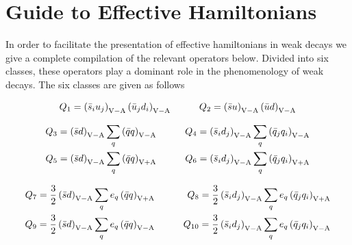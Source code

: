 \section{Guide to Effective Hamiltonians}
         \label{sec:Heffguide}
In order to facilitate the presentation of effective
hamiltonians in weak decays we give a complete compilation of the
relevant operators below. Divided into six classes, these 
operators play a dominant role in the phenomenology of weak decays.
The six classes are given as follows

\medskip


\begin{eqnarray}
Q_{1} = \left( \bar s_{i} u_{j}  \right)_{\rm V-A}
            \left( \bar u_{j}  d_{i} \right)_{\rm V-A}
&\qquad&
Q_{2} = \left( \bar s u \right)_{\rm V-A}
            \left( \bar u d \right)_{\rm V-A}
\label{eq:Q12}
\end{eqnarray}


\begin{eqnarray}
Q_{3} = \left( \bar s d \right)_{\rm V-A}
   \sum_{q} \left( \bar q q \right)_{\rm V-A}
&\qquad&
Q_{4} = \left( \bar s_{i} d_{j}  \right)_{\rm V-A}
   \sum_{q} \left( \bar q_{j}  q_{i} \right)_{\rm V-A}
\label{eq:Q34} \\
Q_{5} = \left( \bar s d \right)_{\rm V-A}
   \sum_{q} \left( \bar q q \right)_{\rm V+A}
&\qquad&
Q_{6} = \left( \bar s_{i} d_{j}  \right)_{\rm V-A}
   \sum_{q} \left( \bar q_{j}  q_{i} \right)_{\rm V+A}
\label{eq:Q56}
\end{eqnarray}


\begin{eqnarray}
Q_{7} = \frac{3}{2} \left( \bar s d \right)_{\rm V-A}
         \sum_{q} e_{q} \left( \bar q q \right)_{\rm V+A}
&\qquad&
Q_{8} = \frac{3}{2} \left( \bar s_{i} d_{j} \right)_{\rm V-A}
         \sum_{q} e_{q} \left( \bar q_{j}  q_{i}\right)_{\rm V+A}
\label{eq:Q78} \\
Q_{9} = \frac{3}{2} \left( \bar s d \right)_{\rm V-A}
         \sum_{q} e_{q} \left( \bar q q \right)_{\rm V-A}
&\qquad&
Q_{10} = \frac{3}{2} \left( \bar s_{i} d_{j} \right)_{\rm V-A}
         \sum_{q} e_{q} \left( \bar q_{j}  q_{i}\right)_{\rm V-A}
\label{eq:Q910}
\end{eqnarray}

